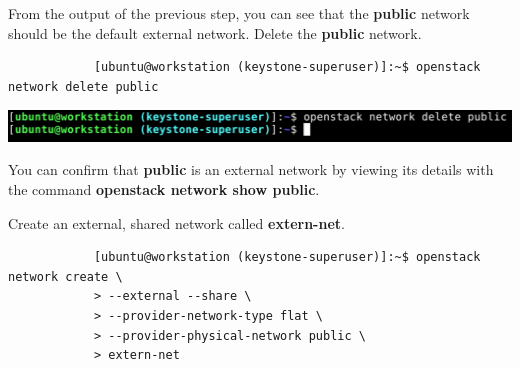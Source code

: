 \documentclass[letterpaper, 12pt]{article}
\begin{document}
\begin{enumerate}
    \begin{labstep}
        From the output of the previous step, you can see that the \textbf{public} network should be the default external network.
        Delete the \textbf{public} network.
        \begin{lstlisting}
            [ubuntu@workstation (keystone-superuser)]:~$ openstack network delete public
        \end{lstlisting}

        \begin{center}
            \includegraphics[width=\linewidth]{images/part1/step20.png}
        \end{center}
    \end{labstep}

    \begin{tipbox}
        You can confirm that \textbf{public} is an external network by viewing its details with the command \textbf{openstack network show public}.
    \end{tipbox}

    \begin{labstep}
        Create an external, shared network called \textbf{extern-net}.
        \begin{lstlisting}
            [ubuntu@workstation (keystone-superuser)]:~$ openstack network create \
            > --external --share \
            > --provider-network-type flat \
            > --provider-physical-network public \
            > extern-net
        \end{lstlisting}


\end{labstep}
\end{enumerate}
\end{document}
